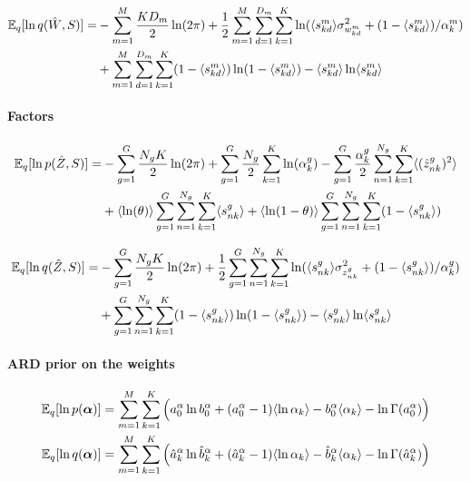 \begin{equation} \begin{aligned}
	\mathbb{E}_q[\ln q(\hat{W}, S)] =&-\sum_{m=1}^{M}\frac{KD_m}{2}\ln(2\pi) + \frac{1}{2}\sum_{m=1}^{M}\sum_{d=1}^{D_m}\sum_{k=1}^{K}\ln(\langle s_{kd}^m \rangle \sigma_{w_{kd}^m}^2 + (1-\langle s_{kd}^m \rangle)/\alpha_k^m) \\
	&+ \sum_{m=1}^{M} \sum_{d=1}^{D_m} \sum_{k=1}^{K} (1-\langle s_{kd}^m \rangle) \ln(1 - \langle s_{kd}^m \rangle) - \langle s_{kd}^m \rangle \ln \langle s_{kd}^m \rangle
\end{aligned} \end{equation}

\paragraph*{Factors}

\begin{equation} \begin{aligned}
    \mathbb{E}_q[\ln p(\hat{Z},S)] =& -\sum_{g=1}^{G}\frac{N_g K}{2}\ln(2\pi) + \sum_{g=1}^{G}\frac{N_g}{2}\sum_{k=1}^{K} \ln(\alpha_k^g) - \sum_{g=1}^{G} \frac{\alpha_k^g}{2} \sum_{n=1}^{N_g} \sum_{k=1}^{K} \langle (\hat{z}_{nk}^g)^2 \rangle \\
    & + \langle \ln(\theta) \rangle \sum_{g=1}^{G} \sum_{n=1}^{N_g} \sum_{k=1}^{K} \langle s_{nk}^g \rangle + \langle \ln(1-\theta) \rangle \sum_{g=1}^{G} \sum_{n=1}^{N_g}\sum_{k=1}^{K} (1- \langle s_{nk}^g \rangle)
\end{aligned} \end{equation}

\begin{equation} \begin{aligned}
	\mathbb{E}_q[\ln q(\hat{Z}, S)] =&-\sum_{g=1}^{G}\frac{N_g K}{2}\ln(2\pi) + \frac{1}{2}\sum_{g=1}^{G}\sum_{n=1}^{N_g}\sum_{k=1}^{K}\ln(\langle s_{nk}^g \rangle \sigma_{z_{nk}^g}^2 + (1-\langle s_{nk}^g \rangle)/\alpha_k^g) \\
	&+ \sum_{g=1}^{G} \sum_{n=1}^{N_g} \sum_{k=1}^{K} (1-\langle s_{nk}^g \rangle) \ln(1 - \langle s_{nk}^g \rangle) - \langle s_{nk}^g \rangle \ln \langle s_{nk}^g \rangle
\end{aligned} \end{equation}

\paragraph*{ARD prior on the weights}

\begin{equation} \begin{aligned}
	\mathbb{E}_q [\ln p(\mbox{\boldmath $\alpha$})] &= \sum_{m=1}^{M}\sum_{k=1}^{K}\Big(a_0^\alpha\ln b_0^\alpha +   (a_0^\alpha - 1) \langle \ln \alpha_k \rangle - b_0^\alpha \langle \alpha_k \rangle - \ln \Gamma(a_0^\alpha) \Big) \\
	\mathbb{E}_q [\ln q(\mbox{\boldmath $\alpha$})] &= \sum_{m=1}^{M}\sum_{k=1}^{K} \Big( \hat{a}_{k}^\alpha \ln \hat{b}_{k}^\alpha + (\hat{a}_{k}^\alpha - 1) \langle \ln \alpha_k \rangle - \hat{b}_{k}^\alpha \langle \alpha_k \rangle - \ln \Gamma(\hat{a}_{k}^\alpha) \Big)
\end{aligned} \end{equation}

